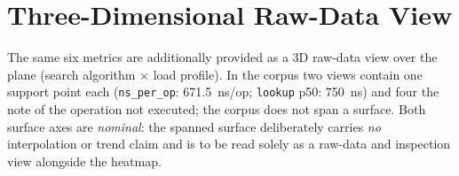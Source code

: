 
\section{Three-Dimensional Raw-Data View}\label{sec:measurements:surfaces3d}

The same six metrics are additionally provided as a 3D raw-data view over the plane (search
algorithm $\times$ load profile). In the corpus two views contain one support point each
(\texttt{ns\_per\_op}: 671.5~ns/op; \texttt{lookup} p50: 750~ns) and four the note of the operation
not executed; the corpus does not span a surface. Both surface axes are \emph{nominal}: the spanned
surface deliberately carries \emph{no} interpolation or trend claim and is to be read solely as a
raw-data and inspection view alongside the heatmap.

